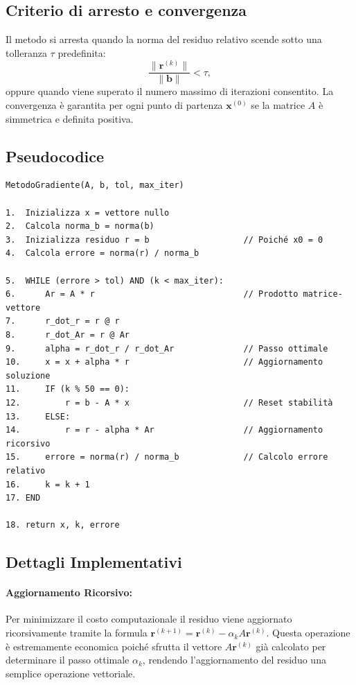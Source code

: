 \documentclass[a4paper, 12pt]{report}
\begin{document}
\subsection*{Criterio di arresto e convergenza}

Il metodo si arresta quando la norma del residuo relativo scende sotto
una tolleranza $\tau$ predefinita:
\[
    \frac{\|\mathbf{r}^{(k)}\|}{\|\mathbf{b}\|} < \tau,
\]
oppure quando viene superato il numero massimo di iterazioni consentito.
La convergenza è garantita per ogni punto di partenza $\mathbf{x}^{(0)}$ se
la matrice $A$ è simmetrica e definita positiva.

\subsection*{Pseudocodice}
\begin{verbatim}
MetodoGradiente(A, b, tol, max_iter)

1.  Inizializza x = vettore nullo
2.  Calcola norma_b = norma(b)
3.  Inizializza residuo r = b                   // Poiché x0 = 0
4.  Calcola errore = norma(r) / norma_b

5.  WHILE (errore > tol) AND (k < max_iter):
6.      Ar = A * r                              // Prodotto matrice-vettore
7.      r_dot_r = r @ r
8.      r_dot_Ar = r @ Ar
9.      alpha = r_dot_r / r_dot_Ar              // Passo ottimale
10.     x = x + alpha * r                       // Aggiornamento soluzione
11.     IF (k % 50 == 0):
12.         r = b - A * x                       // Reset stabilità
13.     ELSE:
14.         r = r - alpha * Ar                  // Aggiornamento ricorsivo
15.     errore = norma(r) / norma_b             // Calcolo errore relativo
16.     k = k + 1
17. END

18. return x, k, errore
\end{verbatim}
\subsection*{Dettagli Implementativi}


\paragraph{Aggiornamento Ricorsivo:}
Per minimizzare il costo computazionale il residuo viene aggiornato ricorsivamente
tramite la formula $\mathbf{r}^{(k+1)} = \mathbf{r}^{(k)} - \alpha_k A\mathbf{r}^{(k)}$.
Questa operazione è estremamente economica poiché sfrutta il vettore $A\mathbf{r}^{(k)}$ già calcolato per determinare il passo ottimale $\alpha_k$, rendendo l'aggiornamento del residuo una semplice operazione vettoriale.
\end{document}
